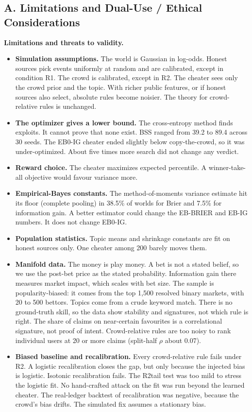 \documentclass[10pt]{article}
\begin{document}
\subsection*{A. Limitations and Dual-Use / Ethical Considerations}
\label{app:limits}
\textbf{Limitations and threats to validity.}
\begin{itemize}\setlength{\itemsep}{1pt}\setlength{\parskip}{0pt}
\item \textbf{Simulation assumptions.} The world is Gaussian in log-odds. Honest sources pick events uniformly at random and are calibrated, except in condition R1. The crowd is calibrated, except in R2. The cheater sees only the crowd prior and the topic. With richer public features, or if honest sources also select, absolute rules become noisier. The theory for crowd-relative rules is unchanged.
\item \textbf{The optimizer gives a lower bound.} The cross-entropy method finds exploits. It cannot prove that none exist. BSS ranged from 39.2 to 89.4 across 30 seeds. The EB0-IG cheater ended slightly below copy-the-crowd, so it was under-optimized. About five times more search did not change any verdict.
\item \textbf{Reward choice.} The cheater maximizes expected percentile. A winner-take-all objective would favour variance more.
\item \textbf{Empirical-Bayes constants.} The method-of-moments variance estimate hit its floor (complete pooling) in 38.5\% of worlds for Brier and 7.5\% for information gain. A better estimator could change the EB-BRIER and EB-IG numbers. It does not change EB0-IG.
\item \textbf{Population statistics.} Topic means and shrinkage constants are fit on honest sources only. One cheater among 200 barely moves them.
\item \textbf{Manifold data.} The money is play money. A bet is not a stated belief, so we use the post-bet price as the stated probability. Information gain there measures market impact, which scales with bet size. The sample is popularity-biased: it comes from the top 1,500 resolved binary markets, with 20 to 500 bettors. Topics come from a crude keyword match. There is no ground-truth skill, so the data show stability and signatures, not which rule is right. The share of claims on near-certain favourites is a correlational signature, not proof of intent. Crowd-relative rules are too noisy to rank individual users at 20 or more claims (split-half $\rho$ about 0.07).
\item \textbf{Biased baseline and recalibration.} Every crowd-relative rule fails under R2. A logistic recalibration closes the gap, but only because the injected bias is logistic. Isotonic recalibration fails. The R2tail test was too mild to stress the logistic fit. No hand-crafted attack on the fit was run beyond the learned cheater. The real-ledger backtest of recalibration was negative, because the crowd's bias drifts. The simulated fix assumes a stationary bias.

\end{itemize}
\end{document}
